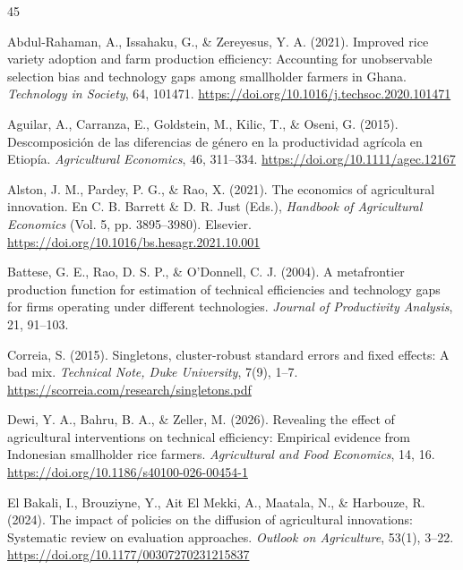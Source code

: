 \documentclass[11pt,a4paper,twocolumn]{article}
\begin{document}
\vspace{-4pt}
\begin{thebibliography}{45}
\footnotesize
\setlength{\itemsep}{0pt}
\setlength{\parskip}{0pt}

Abdul-Rahaman, A., Issahaku, G., \& Zereyesus, Y. A. (2021). Improved rice variety adoption and farm production efficiency: Accounting for unobservable selection bias and technology gaps among smallholder farmers in Ghana. \textit{Technology in Society}, 64, 101471. \url{https://doi.org/10.1016/j.techsoc.2020.101471}

Aguilar, A., Carranza, E., Goldstein, M., Kilic, T., \& Oseni, G. (2015). Descomposición de las diferencias de género en la productividad agrícola en Etiopía. \textit{Agricultural Economics}, 46, 311--334. \url{https://doi.org/10.1111/agec.12167}

Alston, J. M., Pardey, P. G., \& Rao, X. (2021). The economics of agricultural innovation. En C. B. Barrett \& D. R. Just (Eds.), \textit{Handbook of Agricultural Economics} (Vol. 5, pp. 3895--3980). Elsevier. \url{https://doi.org/10.1016/bs.hesagr.2021.10.001}

Battese, G. E., Rao, D. S. P., \& O'Donnell, C. J. (2004). A metafrontier production function for estimation of technical efficiencies and technology gaps for firms operating under different technologies. \textit{Journal of Productivity Analysis}, 21, 91--103.

Correia, S. (2015). Singletons, cluster-robust standard errors and fixed effects: A bad mix. \textit{Technical Note, Duke University}, 7(9), 1--7. \url{https://scorreia.com/research/singletons.pdf}

Dewi, Y. A., Bahru, B. A., \& Zeller, M. (2026). Revealing the effect of agricultural interventions on technical efficiency: Empirical evidence from Indonesian smallholder rice farmers. \textit{Agricultural and Food Economics}, 14, 16. \url{https://doi.org/10.1186/s40100-026-00454-1}

El Bakali, I., Brouziyne, Y., Ait El Mekki, A., Maatala, N., \& Harbouze, R. (2024). The impact of policies on the diffusion of agricultural innovations: Systematic review on evaluation approaches. \textit{Outlook on Agriculture}, 53(1), 3--22. \url{https://doi.org/10.1177/00307270231215837}


\end{thebibliography}
\end{document}
